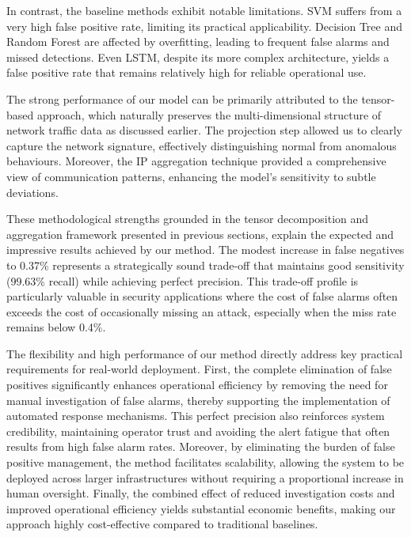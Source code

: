 \documentclass[pdflatex,sn-mathphys-num]{sn-jnl}
\theoremstyle{thmstyleone}
\theoremstyle{thmstyletwo}
\theoremstyle{thmstylethree}
\begin{document}
In contrast, the baseline methods exhibit notable limitations. SVM suffers from a very high false positive rate, limiting its practical applicability. Decision Tree and Random Forest are affected by overfitting, leading to frequent false alarms and missed detections. Even LSTM, despite its more complex architecture, yields a false positive rate that remains relatively high for reliable operational use.

 The strong performance of our model can be primarily attributed to the tensor-based approach, which naturally preserves the multi-dimensional structure of network traffic data as discussed earlier. The projection step allowed us to clearly capture the network signature, effectively distinguishing normal from anomalous behaviours. Moreover, the IP aggregation technique provided a comprehensive view of communication patterns, enhancing the model’s sensitivity to subtle deviations. 
 
 These methodological strengths grounded in the tensor decomposition and aggregation framework presented in previous sections, explain the expected and impressive results achieved by our method. The modest increase in false negatives to 0.37\% represents a strategically sound trade-off that maintains good sensitivity (99.63\% recall) while achieving perfect precision. This trade-off profile is particularly valuable in security applications where the cost of false alarms often exceeds the cost of occasionally missing an attack, especially when the miss rate remains below 0.4\%.


The flexibility and high performance of our method directly address key practical requirements for real-world deployment. First, the complete elimination of false positives significantly enhances operational efficiency by removing the need for manual investigation of false alarms, thereby supporting the implementation of automated response mechanisms. This perfect precision also reinforces system credibility, maintaining operator trust and avoiding the alert fatigue that often results from high false alarm rates. Moreover, by eliminating the burden of false positive management, the method facilitates scalability, allowing the system to be deployed across larger infrastructures without requiring a proportional increase in human oversight. Finally, the combined effect of reduced investigation costs and improved operational efficiency yields substantial economic benefits, making our approach highly cost-effective compared to traditional baselines.
\end{document}
